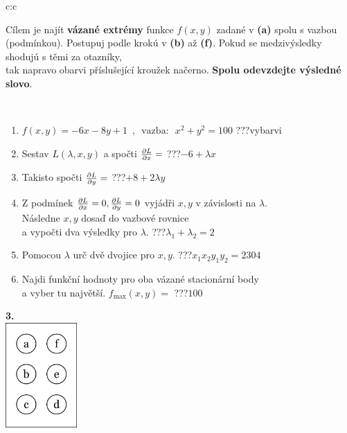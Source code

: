 \documentclass[10pt]{report}
\begin{document}
\begin{tabular}{c:c}
\begin{minipage}[c][104.5mm][t]{0.5\linewidth}
\begin{center}
\begin{minipage}{0.95\linewidth}
\begin{center}
Cílem je najít \textbf{vázané extrémy} funkce $f(x,y)$ zadané v \textbf{(a)} spolu s vazbou (podmínkou). Postupuj podle krokú v \textbf{(b)} až \textbf{(f)}. Pokud se medzivýsledky shodujú s těmi za otazníky,\\tak napravo obarvi příslušející kroužek načerno. \textbf{Spolu odevzdejte výsledné slovo}.
\end{center}
\end{minipage}
\\[1mm]
\begin{minipage}{0.79\linewidth}
\begin{center}
\begin{varwidth}{\linewidth}
\begin{enumerate}
\normalsize
\item $f(x,y)=-6x-8y+1 \enspace , \enspace \mathrm{vazba:} \enspace x^2+y^2=100$\quad \dotfill\; ???\;\dotfill \quad vybarvi
\item Sestav $L(\lambda,x,y)$ a spočti $\pdv{L}{x}=$\quad \dotfill\; ???\;\dotfill \quad $-6+\lambda x$
\item Takisto spočti $\pdv{L}{y}=$\quad \dotfill\; ???\;\dotfill \quad $+8+2\lambda y$
\item Z podmínek $\pdv{L}{x}=0 , \pdv{L}{y}=0$ vyjádři $x,y$ v závislosti na $\lambda$.\\ \phantom{xxxxxx}Následne $x,y$ dosaď do vazbové rovnice\\ \phantom{xxxxxx}a vypočti dva výsledky pro $\lambda$.\quad \dotfill\; ???\;\dotfill \quad $\lambda_1+\lambda_2=2$
\item Pomocou $\lambda$ urč dvě dvojice pro $x,y$.\quad \dotfill\; ???\;\dotfill \quad $x_1 x_2 y_1 y_2=2304$
\item Najdi funkční hodnoty pro oba vázané stacionární body\\ \phantom{xxxxxx}a vyber tu najvětší. $f_{\text{max}}(x,y)=$\quad \dotfill\; ???\;\dotfill \quad $100$
\end{enumerate}
\end{varwidth}
\end{center}
\end{minipage}
\begin{minipage}{0.20\linewidth}
\begin{center}
{\Huge\bfseries 3.} \\[2mm]
\includegraphics[height=40mm]{../images/braille.png}

\end{center}
\end{minipage}
\end{center}
\end{minipage}
\end{tabular}
\end{document}
